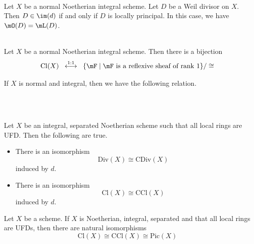 \documentclass[a4paper]{article}
\begin{document}
\begin{prp}{}{}\\
Let $X$ be a normal Noetherian integral scheme. Let $D$ be a Weil divisor on $X$. Then $D\in\im(d)$ if and only if $D$ is locally principal. In this case, we have $\mO(D)=\mL(D)$. 
\end{prp}

\begin{prp}{}{}\\
Let $X$ be a normal Noetherian integral scheme. Then there is a bijection $$\text{Cl}(X)\;\;\overset{1:1}{\longleftrightarrow}\;\;\{\mF\;|\;\mF\text{ is a reflexive sheaf of rank }1\}/\cong$$
\end{prp}

If $X$ is normal and integral, then we have the following relation. 

 \\~\\

\begin{prp}{}{} Let $X$ be an integral, separated Noetherian scheme such that all local rings are UFD. Then the following are true. 
\begin{itemize}
\item There is an isomorphism $$\text{Div}(X)\cong\text{CDiv}(X)$$ induced by $d$. 
\item There is an isomorphism $$\text{Cl}(X)\cong\text{CCl}(X)$$ induced by $d$. 
\end{itemize}
\end{prp}

\begin{crl}{}{} Let $X$ be a scheme. If $X$ is Noetherian, integral, separated and that all local rings are UFDs, then there are natural isomorphisms $$\text{Cl}(X)\cong\text{CCl}(X)\cong\text{Pic}(X)$$
\end{crl}
\end{document}
